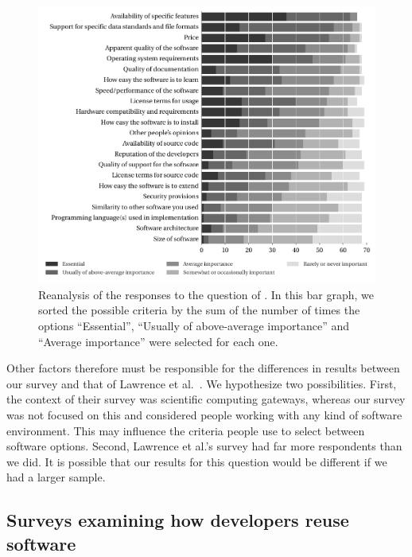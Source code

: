 \documentclass{casicswhitepaper}
\begin{document}
\begin{figure}[t]
  \vspace*{1ex}
  \centering
  \hspace*{-1ex}%
  \includegraphics{files/plots/bar-graph-criteria-ready-to-run-reranked.pdf}
  \vspace*{-4ex}
  \caption{Reanalysis of the responses to the question of \protect{}.  In this bar graph, we sorted the possible criteria by the sum of the number of times the options ``Essential'', ``Usually of above-average importance'' and ``Average importance'' were selected for each one.}
  \label{criteria-ready-to-run-reranked}
\end{figure}

Other factors therefore must be responsible for the differences in results between our survey and that of Lawrence et al.~\cite{lawrence2015science}.  We hypothesize two possibilities.  First, the context of their survey was scientific computing gateways, whereas our survey was not focused on this and considered people working with any kind of software environment.  This may influence the criteria people use to select between software options.  Second, Lawrence et al.'s survey had far more respondents than we did.  It is possible that our results for this question would be different if we had a larger sample.


\subsection{Surveys examining how developers reuse software}
\end{document}
